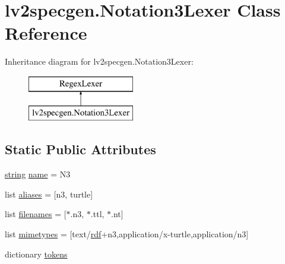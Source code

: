 \hypertarget{classlv2specgen_1_1_notation3_lexer}{}\section{lv2specgen.\+Notation3\+Lexer Class Reference}
\label{classlv2specgen_1_1_notation3_lexer}
Inheritance diagram for lv2specgen.\+Notation3\+Lexer\+:\begin{figure}[H]
\begin{center}
\leavevmode
\includegraphics[height=2.000000cm]{classlv2specgen_1_1_notation3_lexer}
\end{center}
\end{figure}
\subsection*{Static Public Attributes}
\begin{DoxyCompactItemize}
\item 
\hyperlink{test__lib_f_l_a_c_2format_8c_ab02026ad0de9fb6c1b4233deb0a00c75}{string} \hyperlink{classlv2specgen_1_1_notation3_lexer_a8068e4cce7ca73de902cb5927a28f4f7}{name} = \textquotesingle{}N3\textquotesingle{}
\item 
list \hyperlink{classlv2specgen_1_1_notation3_lexer_a1528810c08fc3b0ae8f3d748d9bef845}{aliases} = \mbox{[}\textquotesingle{}n3\textquotesingle{}, \textquotesingle{}turtle\textquotesingle{}\mbox{]}
\item 
list \hyperlink{classlv2specgen_1_1_notation3_lexer_ad20c31b0e8f26409410d80fc6c8051da}{filenames} = \mbox{[}\textquotesingle{}$\ast$.n3\textquotesingle{}, \textquotesingle{}$\ast$.ttl\textquotesingle{}, \textquotesingle{}$\ast$.nt\textquotesingle{}\mbox{]}
\item 
list \hyperlink{classlv2specgen_1_1_notation3_lexer_ae457f5311e2466d8b3b017f987d7de79}{mimetypes} = \mbox{[}\textquotesingle{}text/\hyperlink{namespacelv2specgen_a81517e35ec2b1d55913afce433295382}{rdf}+n3\textquotesingle{},\textquotesingle{}application/x-\/turtle\textquotesingle{},\textquotesingle{}application/n3\textquotesingle{}\mbox{]}
\item 
dictionary \hyperlink{classlv2specgen_1_1_notation3_lexer_a435bf1f767205c233aac68c53c256422}{tokens}
\end{DoxyCompactItemize}


